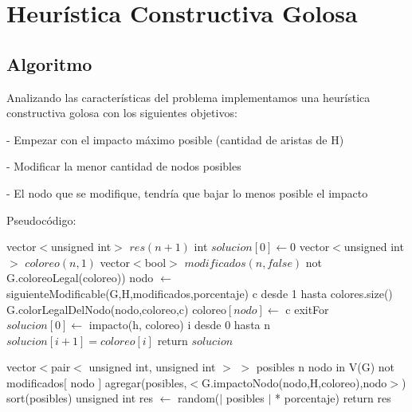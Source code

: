 \section{Heurística Constructiva Golosa}

\subsection{Algoritmo}



\quad Analizando las características del problema implementamos una heurística constructiva golosa con los siguientes objetivos:

\quad

\quad \quad \quad - Empezar con el impacto máximo posible (cantidad de aristas de H)

\quad 

\quad \quad \quad - Modificar la menor cantidad de nodos posibles

\quad

\quad \quad \quad - El nodo que se modifique, tendría que bajar lo menos posible el impacto

\quad

\quad Pseudocódigo:

\begin{algorithm}[H]
\caption{} 
\begin{codebox}

\li vector$<$unsigned int$>$ $res(n+1)$
\li int $solucion[0] \gets 0$
\li vector$<$unsigned int$>$ $coloreo(n,1)$
\li vector$<$bool$>$ $modificados(n,false)$
\li \While not G.coloreoLegal(coloreo)) \Do
\li nodo $ \gets $ siguienteModificable(G,H,modificados,porcentaje)
\li \For c desde 1 hasta colores.size() \Do
\li \If G.colorLegalDelNodo(nodo,coloreo,c)
\li coloreo$ [nodo] \gets $ c
\li exitFor
\End
\End
\End
\li $solucion[0] \gets$ impacto(h, coloreo)
\li \For i desde 0 hasta n \Do
		\li $solucion[i+1]=coloreo[i]$
	\End
\li	return $solucion$
\End
\end{codebox}
\end{algorithm}


\begin{algorithm}[H]
\caption{} 
\begin{codebox}

\li vector$<$pair$<$ unsigned int, unsigned int $>$ $>$ posibles
\li \For n nodo in V(G) \Do
\li \If not modificados$ [ $ nodo $ ] $
\li    agregar(posibles,$<$G.impactoNodo(nodo,H,coloreo),nodo$>$)
\End
\End
\li
\li sort(posibles)
\li
\li unsigned int res $ \gets $ random($ \vert $ posibles  $ \vert $ * porcentaje)
\li
\li return res
\End
\end{codebox}
\end{algorithm}

